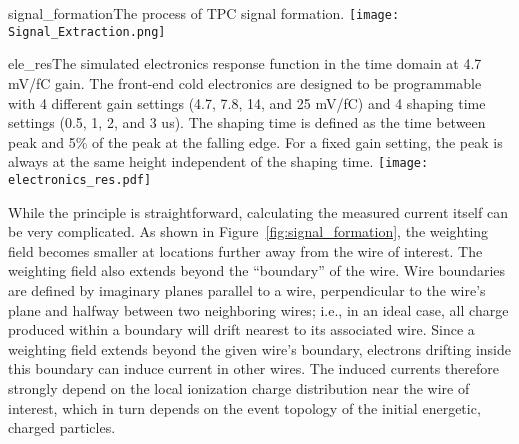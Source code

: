 \begin{cdrfigure}{signal_formation}{The process of TPC signal formation.}
\texttt{[image: Signal\_Extraction.png]}
\end{cdrfigure}

\begin{cdrfigure}{ele_res}{The simulated electronics response function in the time 
domain at 4.7 mV/fC gain. The front-end cold electronics are designed to be 
programmable with 4 different gain settings (4.7, 7.8, 14, and 25 mV/fC) and 
4 shaping time settings (0.5, 1, 2, and 3 us). The shaping time is defined as the time 
between peak and 5\% of the peak at the falling edge. For a fixed gain setting, 
the peak is always at the same height independent of the shaping time. }
\texttt{[image: electronics\_res.pdf]}
\end{cdrfigure}


While the principle is straightforward, calculating the measured
current itself can be very complicated. As shown in
Figure~\ref{fig:signal_formation}, the weighting field becomes smaller
at locations further away from the wire of interest.  
The weighting field also extends beyond the ``boundary'' of the wire.
Wire boundaries are defined by imaginary planes parallel to a wire,
perpendicular to the wire's plane and halfway between two neighboring
wires; i.e.,  in an ideal case, all charge produced within a boundary
will drift nearest to its associated wire. 
Since a weighting field extends beyond the given wire's boundary, electrons drifting inside
this boundary can induce current in other wires.  
The induced currents therefore strongly depend on the local ionization
charge distribution near the wire of interest, which in turn depends
on the event topology of the initial energetic, charged particles.



